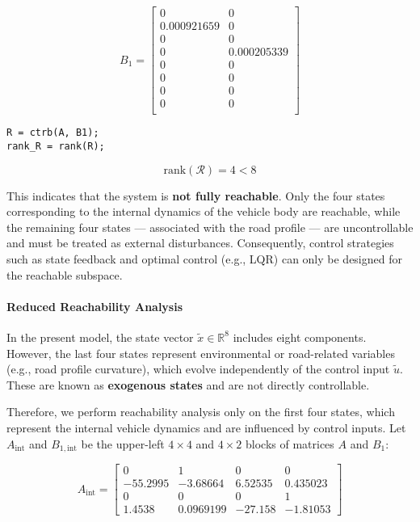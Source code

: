 \documentclass[]{report}
\begin{document}
\[
B_1 =
\begin{bmatrix}
	0 & 0 \\
	0.000921659 & 0  \\
	0 & 0 \\
	0 & 0.000205339 \\
	0 & 0 \\
	0 & 0 \\
	0 & 0 \\
	0 & 0 \\
	
\end{bmatrix}
\]


\begin{verbatim}
R = ctrb(A, B1);
rank_R = rank(R);

\end{verbatim}

\[
\text{rank}(\mathcal{R}) = 4 < 8
\]

This indicates that the system is \textbf{not fully reachable}. Only the four states corresponding to the internal dynamics of the vehicle body are reachable, while the remaining four states — associated with the road profile — are uncontrollable and must be treated as external disturbances. Consequently, control strategies such as state feedback and optimal control (e.g., LQR) can only be designed for the reachable subspace.

\paragraph{Reduced Reachability Analysis}

In the present model, the state vector $\tilde{x} \in \mathbb{R}^8$ includes eight components. However, the last four states represent environmental or road-related variables (e.g., road profile curvature), which evolve independently of the control input $\tilde{u}$. These are known as \textbf{exogenous states} and are not directly controllable.

Therefore, we perform reachability analysis only on the first four states, which represent the internal vehicle dynamics and are influenced by control inputs. Let $A_{\text{int}}$ and $B_{1, \text{int}}$ be the upper-left $4 \times 4$ and $4 \times 2$ blocks of matrices $A$ and $B_1$:

\[
A_{\text{int}} =
\begin{bmatrix}
	0 & 1 & 0 & 0 \\
	-55.2995 & -3.68664 & 6.52535 & 0.435023 \\
	0 & 0 & 0 & 1 \\
	1.4538 & 0.0969199 & -27.158 & -1.81053 
\end{bmatrix}
\]
\end{document}
